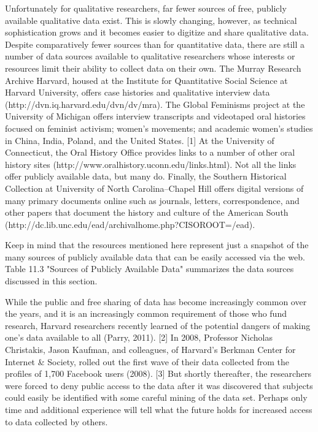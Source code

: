 Unfortunately for qualitative researchers, far fewer sources of free, publicly available qualitative data exist. This is slowly changing, however, as technical sophistication grows and it becomes easier to digitize and share qualitative data. Despite comparatively fewer sources than for quantitative data, there are still a number of data sources available to qualitative researchers whose interests or resources limit their ability to collect data on their own. The Murray Research Archive Harvard, housed at the Institute for Quantitative Social Science at Harvard University, offers case histories and qualitative interview data (http://dvn.iq.harvard.edu/dvn/dv/mra). The Global Feminisms project at the University of Michigan offers interview transcripts and videotaped oral histories focused on feminist activism; women’s movements; and academic women’s studies in China, India, Poland, and the United States. [1] At the University of Connecticut, the Oral History Office provides links to a number of other oral history sites (http://www.oralhistory.uconn.edu/links.html). Not all the links offer publicly available data, but many do. Finally, the Southern Historical Collection at University of North Carolina–Chapel Hill offers digital versions of many primary documents online such as journals, letters, correspondence, and other papers that document the history and culture of the American South (http://dc.lib.unc.edu/ead/archivalhome.php?CISOROOT=/ead).

Keep in mind that the resources mentioned here represent just a snapshot of the many sources of publicly available data that can be easily accessed via the web. Table 11.3 "Sources of Publicly Available Data" summarizes the data sources discussed in this section.


While the public and free sharing of data has become increasingly common over the years, and it is an increasingly common requirement of those who fund research, Harvard researchers recently learned of the potential dangers of making one’s data available to all (Parry, 2011). [2] In 2008, Professor Nicholas Christakis, Jason Kaufman, and colleagues, of Harvard’s Berkman Center for Internet \& Society, rolled out the first wave of their data collected from the profiles of 1,700 Facebook users (2008). [3] But shortly thereafter, the researchers were forced to deny public access to the data after it was discovered that subjects could easily be identified with some careful mining of the data set. Perhaps only time and additional experience will tell what the future holds for increased access to data collected by others.



